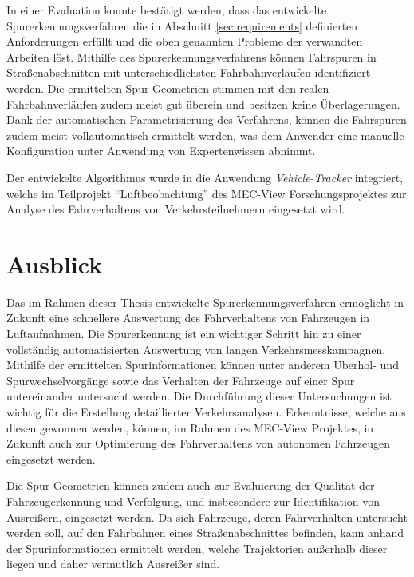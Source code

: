 In einer Evaluation konnte bestätigt werden, dass das entwickelte Spurerkennungsverfahren die in Abschnitt
\ref{sec:requirements} definierten Anforderungen erfüllt und die oben genannten Probleme der verwandten Arbeiten löst.
Mithilfe des Spurerkennungsverfahrens können Fahrspuren in Straßenabschnitten mit unterschiedlichsten
Fahrbahnverläufen identifiziert werden. Die ermittelten Spur-Geometrien stimmen mit den realen Fahrbahnverläufen
zudem meist gut überein und besitzen keine Überlagerungen. Dank der automatischen Parametrisierung des Verfahrens,
können die Fahrspuren zudem meist vollautomatisch ermittelt werden, was dem Anwender eine manuelle Konfiguration
unter Anwendung von Expertenwissen abnimmt.

Der entwickelte Algorithmus wurde in die Anwendung \textit{Vehicle-Tracker} integriert,
welche im Teilprojekt ``Luftbeobachtung'' des MEC-View Forschungsprojektes zur Analyse des Fahrverhaltens
von Verkehrsteilnehmern eingesetzt wird.

\section{Ausblick}

Das im Rahmen dieser Thesis entwickelte Spurerkennungsverfahren ermöglicht in Zukunft eine schnellere Auswertung
des Fahrverhaltens von Fahrzeugen in Luftaufnahmen. Die Spurerkennung ist ein wichtiger Schritt hin zu einer
vollständig automatisierten Auswertung von langen Verkehrsmesskampagnen.
Mithilfe der ermittelten Spurinformationen können
unter anderem Überhol- und Spurwechselvorgänge sowie das Verhalten der Fahrzeuge auf einer Spur
untereinander untersucht werden. Die Durchführung dieser Untersuchungen ist wichtig für die Erstellung
detaillierter Verkehrsanalysen. Erkenntnisse, welche aus diesen gewonnen werden, können, im
Rahmen des MEC-View Projektes, in Zukunft auch zur Optimierung des Fahrverhaltens von autonomen
Fahrzeugen eingesetzt werden.

Die Spur-Geometrien können zudem auch zur Evaluierung der Qualität der Fahrzeugerkennung und Verfolgung,
und insbesondere zur Identifikation von Ausreißern, eingesetzt werden.
Da sich Fahrzeuge, deren Fahrverhalten untersucht werden soll, auf den Fahrbahnen eines Straßenabschnittes befinden,
kann anhand der Spurinformationen ermittelt werden, welche Trajektorien außerhalb dieser liegen und
daher vermutlich Ausreißer sind.

